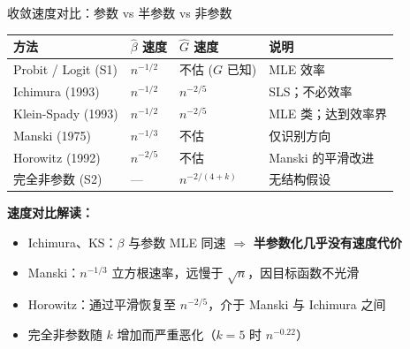 \documentclass[aspectratio=169, 10pt]{beamer}
\begin{document}
\begin{frame}{收敛速度对比：参数 vs 半参数 vs 非参数}

  \begin{center}\footnotesize
  \begin{tabular}{p{3cm}|p{2.5cm}|p{2.5cm}|p{4cm}}
  \hline
  方法 & $\hat\beta$ 速度 & $\hat G$ 速度 & 说明 \\
  \hline
  Probit / Logit (S1) & $n^{-1/2}$ & 不估 ($G$ 已知) & MLE 效率 \\
  \hline
  Ichimura (1993) & $n^{-1/2}$ & $n^{-2/5}$ & SLS；不必效率 \\
  Klein-Spady (1993) & $n^{-1/2}$ & $n^{-2/5}$ & MLE 类；达到效率界 \\
  Manski (1975) & $n^{-1/3}$ & 不估 & 仅识别方向 \\
  Horowitz (1992) & $n^{-2/5}$ & 不估 & Manski 的平滑改进 \\
  \hline
  完全非参数 (S2) & — & $n^{-2/(4+k)}$ & 无结构假设 \\
  \hline
  \end{tabular}
  \end{center}

  \begin{highlightbox}
    \textbf{速度对比解读：}
    \begin{itemize}\setlength{\itemsep}{1pt}
      \item Ichimura、KS：$\beta$ 与参数 MLE 同速 $\Rightarrow$ \textbf{半参数化几乎没有速度代价}
      \item Manski：$n^{-1/3}$ 立方根速率，远慢于 $\sqrt{n}$，因目标函数不光滑
      \item Horowitz：通过平滑恢复至 $n^{-2/5}$，介于 Manski 与 Ichimura 之间
      \item 完全非参数随 $k$ 增加而严重恶化（$k=5$ 时 $n^{-0.22}$）
    \end{itemize}
  \end{highlightbox}

\end{frame}
\end{document}
